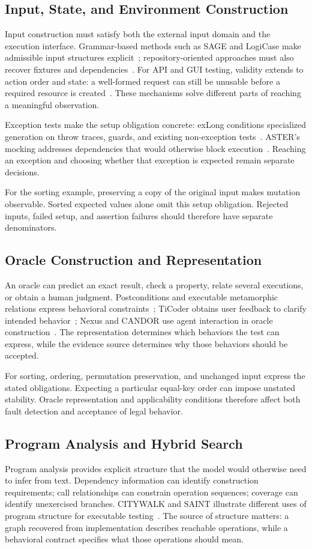 \subsection{Input, State, and Environment Construction}
Input construction must satisfy both the external input domain and the execution interface. Grammar-based methods such as SAGE and LogiCase make admissible input structures explicit~\cite{T08,T09}; repository-oriented approaches must also recover fixtures and dependencies~\cite{U08}. For API and GUI testing, validity extends to action order and state: a well-formed request can still be unusable before a required resource is created~\cite{A01,A02,A03}. These mechanisms solve different parts of reaching a meaningful observation.

Exception tests make the setup obligation concrete: exLong conditions specialized generation on throw traces, guards, and existing non-exception tests~\cite{U16}. ASTER's mocking addresses dependencies that would otherwise block execution~\cite{U12}. Reaching an exception and choosing whether that exception is expected remain separate decisions.

For the sorting example, preserving a copy of the original input makes mutation observable. Sorted expected values alone omit this setup obligation. Rejected inputs, failed setup, and assertion failures should therefore have separate denominators.

\subsection{Oracle Construction and Representation}
An oracle can predict an exact result, check a property, relate several executions, or obtain a human judgment. Postconditions and executable metamorphic relations express behavioral constraints~\cite{O01,O02}; TiCoder obtains user feedback to clarify intended behavior~\cite{T11}; Nexus and CANDOR use agent interaction in oracle construction~\cite{O03,O06}. The representation determines which behaviors the test can express, while the evidence source determines why those behaviors should be accepted.

For sorting, ordering, permutation preservation, and unchanged input express the stated obligations. Expecting a particular equal-key order can impose unstated stability. Oracle representation and applicability conditions therefore affect both fault detection and acceptance of legal behavior.

\subsection{Program Analysis and Hybrid Search}
Program analysis provides explicit structure that the model would otherwise need to infer from text. Dependency information can identify construction requirements; call relationships can constrain operation sequences; coverage can identify unexercised branches. CITYWALK and SAINT illustrate different uses of program structure for executable testing~\cite{U08,A02}. The source of structure matters: a graph recovered from implementation describes reachable operations, while a behavioral contract specifies what those operations should mean.


